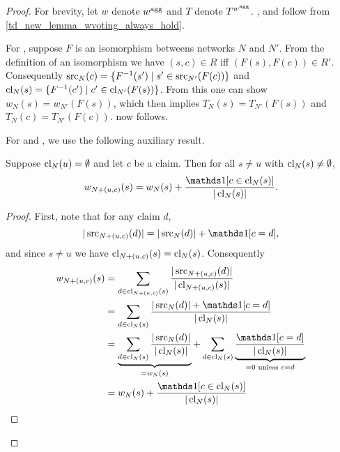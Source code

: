 \begin{proof}
    For brevity, let $w$ denote $w^{\operatorname{agg}}$ and $T$ denote $T^{w^{\operatorname{agg}}}$.
    \claimcoherence{}, \marginaltrustworthiness{} and \trustbasedmon{} follow
    from \cref{td_new_lemma_wvoting_always_hold}.

    For \symmetry{}, suppose $F$ is an isomorphism betweens networks $N$ and
    $N'$. From the definition of an isomorphism we have $(s, c) \in R$ iff
    $(F(s), F(c)) \in R'$. Consequently $\operatorname{src}_N(c) = \{F^{-1}(s') \mid s' \in
    \operatorname{src}_{N'}(F(c))\}$ and $\operatorname{cl}_N(s) = \{F^{-1}(c') \mid c' \in
    \operatorname{cl}_{N'}(F(s))\}$. From this one can show $w_N(s) = w_{N'}(F(s))$,
    which then implies $T_N(s) = T_{N'}(F(s))$ and $T_N(c) = T_{N'}(F(c))$.
    \symmetry{} now follows.

    For \freshposresp{} and \sourceposresp{}, we use the following auxiliary
    result.

    \begin{claim}
        \label{td_new_claim_wagree_new_report}
        Suppose $\operatorname{cl}_N(u) = \emptyset$ and let $c$ be a claim. Then for all
        $s \ne u$ with $\operatorname{cl}_N(s) \ne \emptyset$,
        \[
            w_{\addclaim{N}{u}{c}}(s) = w_N(s) +
            \frac{\indicator{c \in \claims_N(s)}}{|\claims_N(s)|}.
        \]
    \end{claim}
    \begin{proof}
        First, note that for any claim $d$,
        \[
            |\src_{\addclaim{N}{u}{c}}(d)| = |\src_N(d)| + \indicator{c = d},
        \]
        and since $s \ne u$ we have $\operatorname{cl}_{{N} + ({u}, {c})}(s) =
        \operatorname{cl}_N(s)$. Consequently
        \begin{align*}
            w_{\addclaim{N}{u}{c}}(s)
            &= \sum_{d \in \claims_{\addclaim{N}{u}{c}}(s)}{
                \frac{|\src_{\addclaim{N}{u}{c}}(d)|}{|\claims_{\addclaim{N}{u}{c}}(s)|}
            } \\
            &= \sum_{d \in \claims_N(s)}{
                \frac{|\src_N(d)| + \indicator{c = d}}{|\claims_N(s)|}
            } \\
            &=
            \underbrace{
                \sum_{d \in \claims_N(s)}{
                    \frac{|\src_N(d)|}{|\claims_N(s)|}
                }
            }_{= w_N(s)}
            + \sum_{d \in \claims_N(s)}{
                \underbrace{
                    \frac{\indicator{c = d}}{|\claims_N(s)|}
                }_{= 0 \text{ unless } c = d}
            } \\
            &= w_N(s) + \frac{\indicator{c \in \claims_N(s)}}{|\claims_N(s)|}
        \end{align*}
    \end{proof}


\end{proof}
